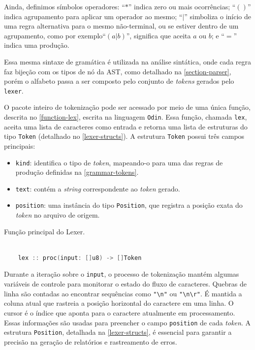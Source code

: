 Ainda, definimos símbolos operadores: ``$*$'' indica zero ou mais ocorrências; ``$()$'' indica agrupamento para aplicar um operador ao mesmo; ``$|$'' simboliza o início de uma regra alternativa para o mesmo não-terminal, ou se estiver dentro de um agrupamento, como por exemplo``$(a|b)$'', significa que aceita $a$ ou $b$; e ``$=$'' indica uma produção.

Essa mesma sintaxe de gramática é utilizada na análise sintática, onde cada regra faz bijeção com os tipos de nó da AST, como detalhado na \autoref{section-parser}, porém o alfabeto passa a ser composto pelo conjunto de \textit{tokens} gerados pelo \texttt{lexer}.


O pacote inteiro de tokenização pode ser acessado por meio de uma única função, descrita no \autoref{function-lex}, escrita na linguagem \texttt{Odin}. Essa função, chamada \texttt{lex}, aceita uma lista de caracteres como entrada e retorna uma lista de estruturas do tipo \texttt{Token} (detalhado no \autoref{lexer-structs}). A estrutura \texttt{Token} possui três campos principais:

\begin{itemize}
    \item \texttt{kind}: identifica o tipo de \textit{token}, mapeando-o para uma das regras de produção definidas na \autoref{grammar-tokens}.
    \item \texttt{text}: contém a \textit{string} correspondente ao \textit{token} gerado.
    \item \texttt{position}: uma instância do tipo \texttt{Position}, que registra a posição exata do \textit{token} no arquivo de origem.
\end{itemize}


\begin{codigo}[htb]
        \caption{\small Função principal do Lexer. }
        \label{function-lex}
  \begin{lstlisting}[language = c]
  
    lex :: proc(input: []u8) -> []Token
  \end{lstlisting}
\end{codigo}



Durante a iteração sobre o \texttt{input}, o processo de tokenização mantém algumas variáveis de controle para monitorar o estado do fluxo de caracteres. Quebras de linha são contadas ao encontrar sequências como \verb|"\n"| ou \verb|"\n\r"|. É mantida a coluna atual que rastreia a posição horizontal do caractere em uma linha. O cursor é o índice que aponta para o caractere atualmente em processamento. Essas informações são usadas para preencher o campo \texttt{position} de cada \textit{token}. A estrutura \texttt{Position}, detalhada na \autoref{lexer-structs}, é essencial para garantir a precisão na geração de relatórios e rastreamento de erros.

